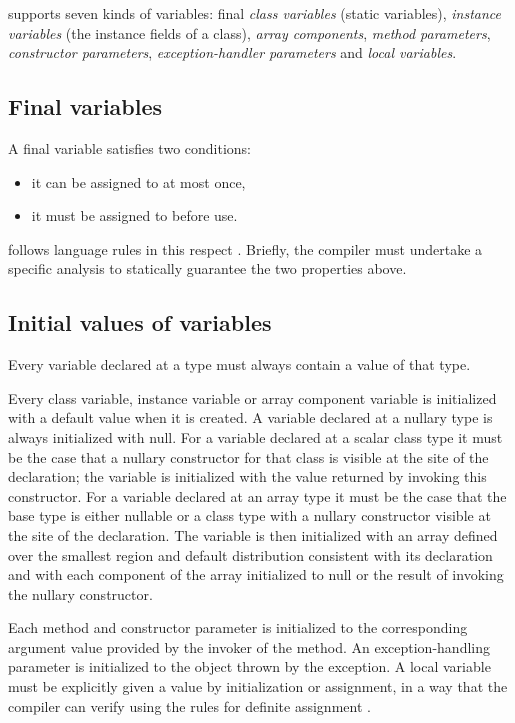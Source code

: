 \Xten{} supports seven kinds of variables: final {\em class
variables} (static variables), {\em instance variables} (the instance
fields of a class), {\em array components}, {\em method parameters},
{\em constructor parameters}, {\em exception-handler parameters} and
{\em local variables}.

\subsection{Final variables}\label{FinalVariable}
A final variable satisfies two conditions: 
\begin{itemize}
\item it can be assigned to at most once, 
\item it must be assigned to before use. 
\end{itemize}

\Xten{} follows \java{} language rules in this respect \cite[\S
4.5.4,8.3.1.2,16]{jls2}. Briefly, the compiler must undertake a
specific analysis to statically guarantee the two properties above.


\subsection{Initial values of variables}
\label{NullaryConstructor}
Every variable declared at a type must always contain a value of that type.

Every class variable, instance variable or array component variable is
initialized with a default value when it is created.  A variable
declared at a nullary type is always initialized with {\cf null}. For
a variable declared at a scalar class type it must be the case that a
nullary constructor for that class is visible at the site of the
declaration; the variable is initialized with the value returned by
invoking this constructor. For a variable declared at an array type it
must be the case that the base type is either nullable or a class type
with a nullary constructor visible at the site of the declaration. The
variable is then initialized with an array defined over the smallest
region and default distribution consistent with its declaration and
with each component of the array initialized to {\cf null} or the
result of invoking the nullary constructor.

Each method and constructor parameter is initialized to the
corresponding argument value provided by the invoker of the method. An
exception-handling parameter is initialized to the object thrown by
the exception. A local variable must be explicitly given a value by
initialization or assignment, in a way that the compiler can verify
using the rules for definite assignment \cite[\S~16]{jls2}.

